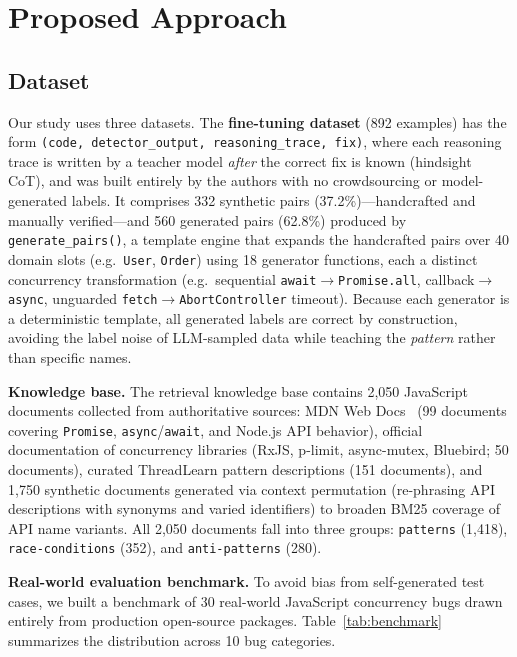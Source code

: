 \documentclass[runningheads]{llncs}
\begin{document}
\section{Proposed Approach}
\label{sec:design}

\subsection{Dataset}
\label{sec:design:dataset}

Our study uses three datasets.
The \textbf{fine-tuning dataset} (892 examples) has the form
\texttt{(code, detector\_output, reasoning\_trace, fix)}, where each
reasoning trace is written by a teacher model \emph{after} the correct fix
is known (hindsight CoT), and was built entirely by the authors with no
crowdsourcing or model-generated labels.
It comprises 332 synthetic pairs (37.2\%)---handcrafted and manually
verified---and 560 generated pairs (62.8\%) produced by
\texttt{generate\_pairs()}, a template engine that expands the handcrafted
pairs over 40 domain slots (e.g.\ \texttt{User}, \texttt{Order}) using 18
generator functions, each a distinct concurrency transformation (e.g.\
sequential \texttt{await}$\to$\texttt{Promise.all}, callback$\to$\texttt{async},
unguarded \texttt{fetch}$\to$\texttt{AbortController} timeout).
Because each generator is a deterministic template, all generated labels
are correct by construction, avoiding the label noise of LLM-sampled data
while teaching the \emph{pattern} rather than specific names.

\textbf{Knowledge base.}
The retrieval knowledge base contains 2,050 JavaScript documents collected
from authoritative sources: MDN Web Docs~\cite{mdn} (99 documents covering
\texttt{Promise}, \texttt{async}/\texttt{await}, and Node.js API
behavior), official documentation of concurrency libraries
(RxJS, p-limit, async-mutex, Bluebird; 50 documents), curated ThreadLearn
pattern descriptions (151 documents), and 1,750 synthetic documents
generated via context permutation (re-phrasing API descriptions with
synonyms and varied identifiers) to broaden BM25 coverage of API name
variants.
All 2,050 documents fall into three groups: \texttt{patterns} (1,418),
\texttt{race-conditions} (352), and \texttt{anti-patterns} (280).

\textbf{Real-world evaluation benchmark.}
To avoid bias from self-generated test cases, we built a benchmark of 30
real-world JavaScript concurrency bugs drawn entirely from production
open-source packages.
Table~\ref{tab:benchmark} summarizes the distribution across 10 bug
categories.
\end{document}
